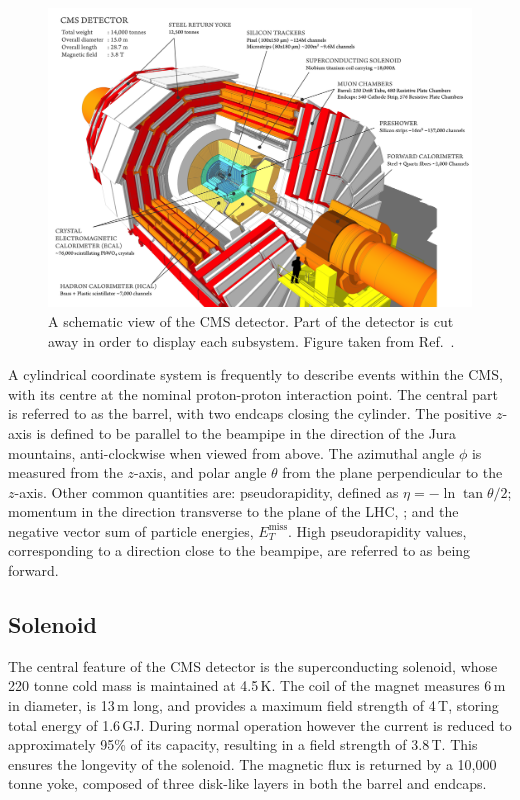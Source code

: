 \begin{figure}[h!]
  \centering
  \includegraphics[width=\textwidth]{Figures/Detector/CMSschematic.png}
  \caption[A schematic view of the CMS detector.]
  {A schematic view of the CMS detector.
  Part of the detector is cut away in order to display each subsystem.
  Figure taken from Ref.~\cite{SketchUp}.}
  \label{fig:detector_CMSschematic}
\end{figure}

A cylindrical coordinate system is frequently to describe events within the CMS, with its centre at the nominal proton-proton interaction point.
The central part is referred to as the barrel, with two endcaps closing the cylinder.
The positive $z$-axis is defined to be parallel to the beampipe in the direction of the Jura mountains, anti-clockwise when viewed from above.
The azimuthal angle $\phi$ is measured from the $z$-axis, and polar angle $\theta$ from the plane perpendicular to the $z$-axis.
Other common quantities are: pseudorapidity, defined as $\eta = -\ln{\tan{\theta/2}}$; 
momentum in the direction transverse to the plane of the LHC, \pt; 
and the negative vector sum of particle energies, $E^{\textrm{miss}}_{T}$.
High pseudorapidity values, corresponding to a direction close to the beampipe, are referred to as being forward.

\subsection{Solenoid}

The central feature of the CMS detector is the superconducting solenoid, whose 220 tonne cold mass is maintained at 4.5\,K.%
The coil of the magnet measures 6\,m in diameter, is 13\,m long, and provides a maximum field strength of 4\,T, storing  total energy of 1.6\,GJ.
During normal operation however the current is reduced to approximately 95\% of its capacity, resulting in a field strength of 3.8\,T.
This ensures the longevity of the solenoid.
The magnetic flux is returned by a 10,000 tonne yoke, composed of three disk-like layers in both the barrel and endcaps.


